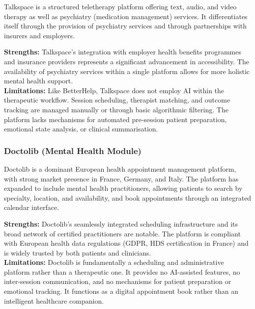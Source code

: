 Talkspace is a structured teletherapy platform offering text, audio, and video
therapy as well as psychiatry (medication management) services. It differentiates
itself through the provision of psychiatry services and through partnerships with
insurers and employers.

\begin{tcolorbox}[colback=lightgray, colframe=accentblue, title=\textbf{Talkspace — Assessment}, fonttitle=\bfseries, sharp corners=south]
  \textbf{Strengths:} Talkspace's integration with employer health benefits
  programmes and insurance providers represents a significant advancement in
  accessibility. The availability of psychiatry services within a single platform
  allows for more holistic mental health support. \\[4pt]
  \textbf{Limitations:} Like BetterHelp, Talkspace does not employ AI within the
  therapeutic workflow. Session scheduling, therapist matching, and outcome
  tracking are managed manually or through basic algorithmic filtering. The
  platform lacks mechanisms for automated pre-session patient preparation,
  emotional state analysis, or clinical summarisation.
\end{tcolorbox}

\subsubsection{Doctolib (Mental Health Module)}

Doctolib is a dominant European health appointment management platform, with
strong market presence in France, Germany, and Italy. The platform has expanded
to include mental health practitioners, allowing patients to search by specialty,
location, and availability, and book appointments through an integrated calendar
interface.

\begin{tcolorbox}[colback=lightgray, colframe=accentblue, title=\textbf{Doctolib — Assessment}, fonttitle=\bfseries, sharp corners=south]
  \textbf{Strengths:} Doctolib's seamlessly integrated scheduling infrastructure
  and its broad network of certified practitioners are notable. The platform is
  compliant with European health data regulations (GDPR, HDS certification in
  France) and is widely trusted by both patients and clinicians. \\[4pt]
  \textbf{Limitations:} Doctolib is fundamentally a scheduling and administrative
  platform rather than a therapeutic one. It provides no AI-assisted features, no
  inter-session communication, and no mechanisms for patient preparation or
  emotional tracking. It functions as a digital appointment book rather than an
  intelligent healthcare companion.
\end{tcolorbox}

